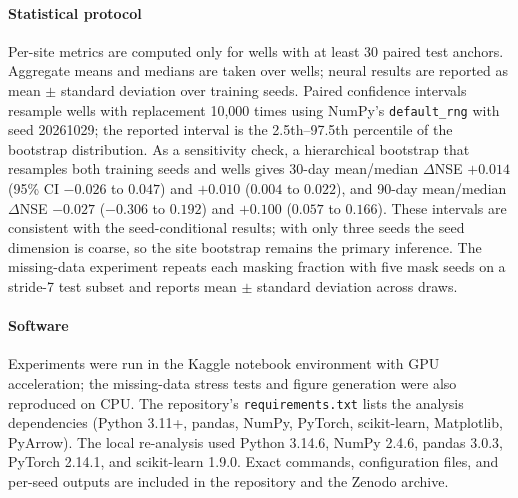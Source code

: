 \documentclass[preprint,12pt]{elsarticle}
\begin{document}
\paragraph{Statistical protocol}
Per-site metrics are computed only for wells with at least 30 paired test
anchors. Aggregate means and medians are taken over wells; neural results are
reported as mean $\pm$ standard deviation over training seeds. Paired
confidence intervals resample wells with replacement 10{,}000 times using
NumPy's \texttt{default\_rng} with seed 20261029; the reported interval is the
2.5th--97.5th percentile of the bootstrap distribution. As a sensitivity
check, a hierarchical bootstrap that resamples both training seeds and wells
gives 30-day mean/median $\Delta$NSE $+0.014$ (95\% CI $-0.026$ to $0.047$)
and $+0.010$ ($0.004$ to $0.022$), and 90-day mean/median $\Delta$NSE $-0.027$
($-0.306$ to $0.192$) and $+0.100$ ($0.057$ to $0.166$). These intervals are
consistent with the seed-conditional results; with only three seeds the seed
dimension is coarse, so the site bootstrap remains the primary inference. The
missing-data
experiment repeats each masking fraction with five mask seeds on a stride-7
test subset and reports mean $\pm$ standard deviation across draws.

\paragraph{Software}
Experiments were run in the Kaggle notebook environment with GPU acceleration;
the missing-data stress tests and figure generation were also reproduced on
CPU. The repository's \texttt{requirements.txt} lists the analysis
dependencies (Python 3.11+, pandas, NumPy, PyTorch, scikit-learn, Matplotlib,
PyArrow). The local re-analysis used Python 3.14.6, NumPy 2.4.6, pandas 3.0.3,
PyTorch 2.14.1, and scikit-learn 1.9.0. Exact commands, configuration files,
and per-seed outputs are included in the repository and the Zenodo archive.



\end{document}
